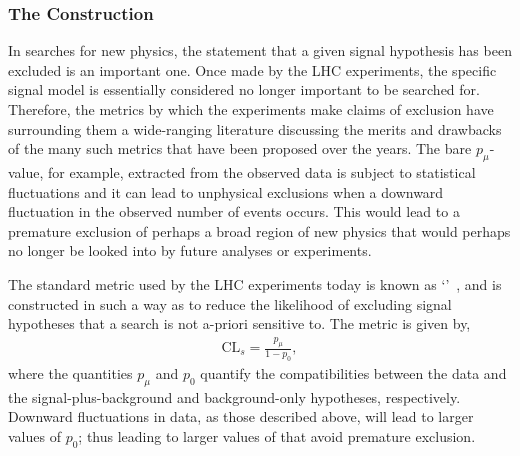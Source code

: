 %
%

\subsubsection{The \cls Construction}
\label{sec:cls_method}

In searches for new physics, the statement that a given signal hypothesis has been excluded
is an important one.
Once made by the LHC experiments, the specific signal model is essentially considered
no longer important to be searched for.
Therefore, the metrics by which the experiments make claims of exclusion have surrounding them
a wide-ranging literature discussing the merits and drawbacks of the many such metrics
that have been proposed over the years.
The bare $p_{\mu}$-value, for example, extracted from the observed data is subject to statistical fluctuations
and it can lead to unphysical exclusions when a downward fluctuation in the observed
number of events occurs.
This would lead to a premature exclusion of perhaps a broad region of new physics
that would perhaps no longer be looked into by future analyses or experiments.

The standard metric used by the LHC experiments today is known as `\cls'~\cite{CLSReadI,CLSReadII},
and is constructed in such a way as to reduce the likelihood of excluding signal
hypotheses that a search is not a-priori sensitive to.
The \cls metric is given by,
\begin{align}
    \text{CL}_s = \frac{p_{\mu}}{1-p_0},
    \label{eq:cls_def}
\end{align}
where the quantities $p_{\mu}$ and $p_0$ quantify the compatibilities between the data and the signal-plus-background
and background-only hypotheses, respectively.
Downward fluctuations in data, as those described above, will lead to larger values of $p_0$; thus
leading to larger values of \cls that avoid premature exclusion.

